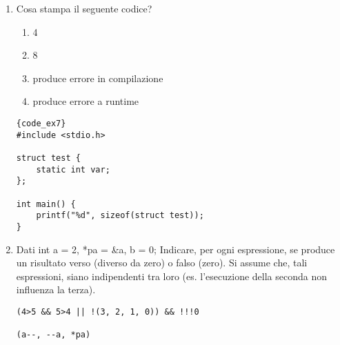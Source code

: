 \begin{enumerate}

\vspace{.6cm}
\item {} Cosa stampa il seguente codice? 
      
\begin{minipage}{.45\textwidth}
    \begin{enumerate} 
        \item 4
        \item 8
        \item produce errore in compilazione
        \item produce errore a runtime
     \end{enumerate}
     
    \begin{lstlisting}{code_ex7}
#include <stdio.h>

struct test {
    static int var;
};

int main() {
    printf("%d", sizeof(struct test));
}
    \end{lstlisting}
\end{minipage}\hfill
\begin{minipage}[t]{.50\textwidth}
\end{minipage}



\vspace{.8cm}
\item {} Dati int a = 2, *pa = \&a, b = 0; Indicare, per ogni espressione, se produce un risultato verso (diverso da zero) o falso (zero). Si assume che, tali espressioni, siano indipendenti tra loro (es. l'esecuzione della seconda non influenza la terza).
\vspace{.3cm}

\begin{minipage}{.45\textwidth}
\begin{verbatim}
(4>5 && 5>4 || !(3, 2, 1, 0)) && !!!0

(a--, --a, *pa)


\end{verbatim}
\end{minipage}
\end{enumerate}
